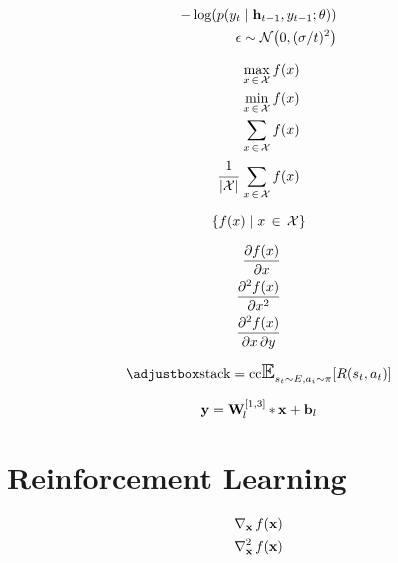 \documentclass[a4paper,11pt]{article}
\begin{document}
\begin{align*}
	-\apply{\log}{\pc{y_{t}}{\ve{h}_{t-1},y_{t-1};\theta}} \\
	\epsilon \obey \normdist{0}{(\sigma/t)^{2}}
\end{align*}

\begin{align*}
	\maxset{f}{x}{\mathcal{X}} \\
	\minset{f}{x}{\mathcal{X}} \\
	\sumset{f}{x}{\mathcal{X}} \\
	\meanset{f}{x}{\mathcal{X}} \\
\end{align*}

\begin{equation*}
	\mapset{f}{x}{\mathcal{X}}
\end{equation*}

\begin{align*}
	\pd{\apply{f}{x}}{x} \\
	\pdn{\apply{f}{x}}{x}{2} \\
	\pds{\apply{f}{x}}{x}{y} \\
\end{align*}

\begin{equation}
	\applyb{\expect_{s_{t}\obey E,a_i\obey \pi}}{\apply{R}{s_{t},a_{t}}}
\end{equation}


\begin{equation}
	\ve{y}=\conv{1,3}{\ve{x}}{l}
\end{equation}


\section{Reinforcement Learning} %
\label{sec:reinforcement_learning}

\newcommand{\grad}[3]{\nabla_{#3}\,\apply{#1}{#2}}
\newcommand{\gradn}[4]{\nabla_{#3}^{#4}\,\apply{#1}{#2}}


\begin{align*}
	\grad{f}{\ve{x}}{\ve{x}} \\
	\gradn{f}{\ve{x}}{\ve{x}}{2}
\end{align*}


	
\end{document}
